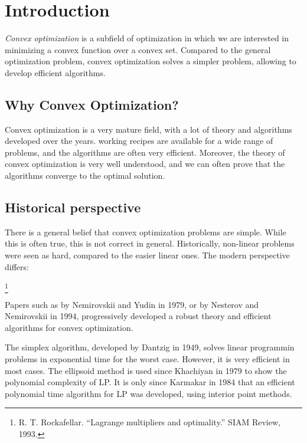 \section{Introduction}
\emph{Convex optimization} is a subfield of optimization in which we are interested in minimizing a convex function over a convex set. Compared to the general optimization problem, convex optimization solves a simpler problem, allowing to develop efficient algorithms.

\subsection{Why Convex Optimization?}
Convex optimization is a very mature field, with a lot of theory and algorithms developed over the years.  working recipes are available for a wide range of problems, and the algorithms are often very efficient. Moreover, the theory of convex optimization is very well understood, and we can often prove that the algorithms converge to the optimal solution.

\subsection{Historical perspective}
There is a general belief that convex optimization problems are simple. While this is often true, this is not correct in general. Historically, non-linear problems were seen as hard, compared to the easier linear ones. The modern perspective differs:
\begin{center}
    \footnote{R. T. Rockafellar. “Lagrange multipliers and optimality.” SIAM Review, 1993.}
\end{center}
Papers such as  by Nemirovskii and Yudin in 1979, or  by Nesterov and Nemirovskii in 1994, progressively developed a robust theory and efficient algorithms for convex optimization.

The simplex algorithm, developed by Dantzig in 1949, solves linear programmin problems in exponential time for the worst case. However, it is very efficient in most cases. The ellipsoid method is used since Khachiyan in 1979 to show the polynomial complexity of LP. It is only since Karmakar in 1984 that an efficient polynomial time algorithm for LP was developed, using interior point methods.


